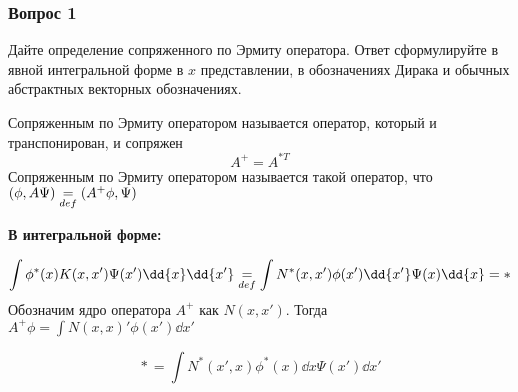\subsubsection{Вопрос 1}


Дайте определение сопряженного по Эрмиту оператора. Ответ сформулируйте в явной интегральной форме в $x$ представлении, в обозначениях Дирака и обычных абстрактных векторных обозначениях.

Сопряженным по Эрмиту оператором называется оператор, который и транспонирован, и сопряжен
$$A^+=A^{*T} $$
Сопряженным по Эрмиту оператором называется такой оператор, что 
$(\phi,A\Psi)\underset{def}{=}(A^+\phi,\Psi)$

\textbf{В интегральной форме:}

$$\big \int\phi^*(x)K(x,x')\Psi(x')\dd{x}\dd{x'}\definition\int N^*(x,x')\phi(x')\dd{x'}\Psi(x)\dd{x}=*$$
Обозначим ядро оператора $A^+$ как $N(x,x')$. Тогда $A^+\phi=\int N(x,x)'\phi(x')\dd{x'}$

$$\big *=\int N^*(x',x)\phi^*(x)\dd{x}\Psi(x')\dd{x'}$$